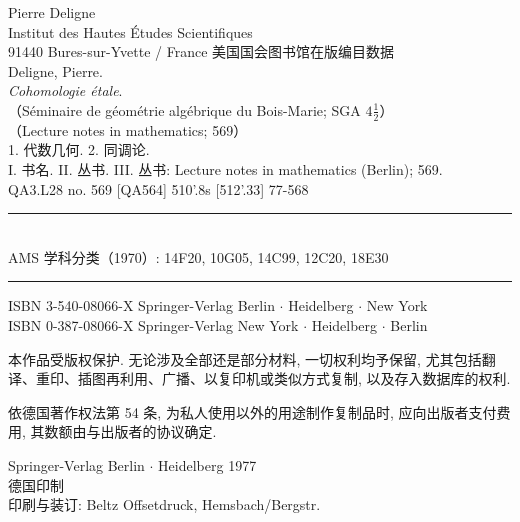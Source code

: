 \thispagestyle{empty}
\begingroup\small
\noindent Pierre Deligne\\
Institut des Hautes Études Scientifiques\\
91440 Bures-sur-Yvette / France
\vfill
\noindent 美国国会图书馆在版编目数据\\
Deligne, Pierre.\\
\emph{Cohomologie étale}.\\
（Séminaire de géométrie algébrique du Bois-Marie; SGA $4\frac12$）\\
（Lecture notes in mathematics; 569）\\
1. 代数几何. 2. 同调论.\\
I. 书名. II. 丛书. III. 丛书: Lecture notes in mathematics (Berlin); 569.\\
QA3.L28 no. 569 [QA564] 510'.8s [512'.33] 77-568

\noindent\rule{\linewidth}{.4pt}\\
AMS 学科分类（1970）: 14F20, 10G05, 14C99, 12C20, 18E30\\
\rule{\linewidth}{.4pt}

\noindent ISBN 3-540-08066-X Springer-Verlag Berlin $\cdot$ Heidelberg $\cdot$ New York\\
ISBN 0-387-08066-X Springer-Verlag New York $\cdot$ Heidelberg $\cdot$ Berlin

本作品受版权保护. 无论涉及全部还是部分材料, 一切权利均予保留, 尤其包括翻译、重印、插图再利用、广播、以复印机或类似方式复制, 以及存入数据库的权利.

依德国著作权法第 54 条, 为私人使用以外的用途制作复制品时, 应向出版者支付费用, 其数额由与出版者的协议确定.

\noindent\textcopyright{} Springer-Verlag Berlin $\cdot$ Heidelberg 1977\\
德国印制\\
印刷与装订: Beltz Offsetdruck, Hemsbach/Bergstr.
\endgroup
\clearpage
